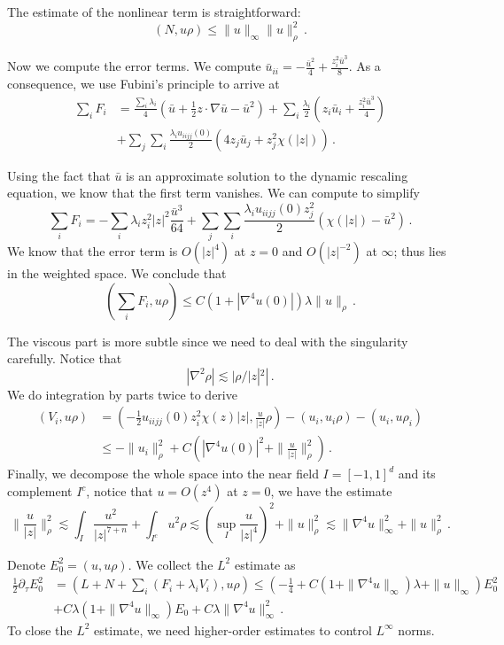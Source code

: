 \documentclass[12pt]{caltech_thesis}
\numberwithin{equation}{section}
\begin{document}
The estimate of the nonlinear term is straightforward:
$$(N,u\rho)\leq\|u\|_{\infty}\|u\|_{\rho}^2\,.$$

Now we compute the error terms. We compute $\bar{u}_{ii}=-\frac{\bar{u}^2}{4}+\frac{z_i^2\bar{u}^3}{8}$. As a consequence, we use Fubini's principle to arrive at $$\begin{aligned}
\sum_{i}F_i&=\frac{\sum_i\lambda_i}{4}(\bar{u}+\frac{1}{2}z\cdot\nabla\bar{u}-\bar{u}^2)+\sum_i\frac{\lambda_i}{2}(z_i\bar{u}_i+\frac{z_i^2\bar{u}^3}{4})\\&+\sum_j\sum_i\frac{\lambda_i u_{iijj}(0)}{2}(4z_j\bar{u}_j+z_j^2\chi(|z|))\,.
\end{aligned}$$


Using the fact that $\bar{u}$ is an approximate solution to the dynamic rescaling equation, we know that the first term vanishes. We can compute to simplify $$\sum_{i}F_i=-\sum_i\lambda_iz_i^2|z|^2\frac{\bar{u}^3}{64}+\sum_j\sum_i\frac{\lambda_i u_{iijj}(0)z_j^2}{2}(\chi(|z|)-\bar{u}^2)\,.$$
We know that the error term is $O(|z|^4)$ at $z=0$ and $O(|z|^{-2})$ at $\infty$; thus lies in the weighted space. We conclude that $$(\sum_{i}F_i,u\rho)\leq C(1+|\nabla^4u(0)|)\lambda\|u\|_{\rho}\,.$$

The viscous part is more subtle since we need to deal with the singularity carefully. Notice that $$|\nabla^2\rho|\lesssim|\rho/|z|^2|\,.$$ We do integration by parts twice to derive
\begin{equation*}
\begin{aligned}
    (V_i,u\rho)&=(-\frac{1}{2}u_{iijj}(0)z_i^2\chi(z)|z|,\frac{u}{|z|}\rho)-(u_i,u_i\rho)-(u_i,u\rho_i)\\&\leq-\|u_i\|_{\rho}^2+C(|\nabla^4u(0)|^2+\|\frac{u}{|z|}\|_{\rho}^2)\,.
\end{aligned}
\end{equation*}
Finally, we decompose the whole space into the near field $I=[-1,1]^d$ and its complement $I^c$, notice that $u=O(z^4)$ at $z=0$, we have the estimate $$\|\frac{u}{|z|}\|_{\rho}^2\lesssim\int_{I}\frac{u^2}{|z|^{7+n}}+\int_{I^c}{u^2}{\rho}\lesssim(\sup_{I}\frac{u}{|z|^4})^2+\|u\|_{\rho}^2\lesssim\|\nabla^4u\|_{\infty}^2+\|u\|_{\rho}^2\,.$$

Denote $E^2_0=(u,u\rho)$. We collect the $L^2$ estimate as\begin{equation}
\begin{aligned}
\label{L2-col}
    \frac{1}{2}\partial_\tau E^2_0&=(L+N+\sum_i(F_i+\lambda _iV_i),u\rho)\leq(-\frac{1}{4}+C(1+\|\nabla^4u\|_{\infty})\lambda+\|u\|_{\infty})E^2_0\\&+C\lambda(1+\|\nabla^4u\|_{\infty}) E_0+C\lambda\|\nabla^4u\|_{\infty}^2\,.
    \end{aligned}
\end{equation}
To close the $L^2$ estimate, we need higher-order estimates to control $L^{\infty}$ norms.
\end{document}
